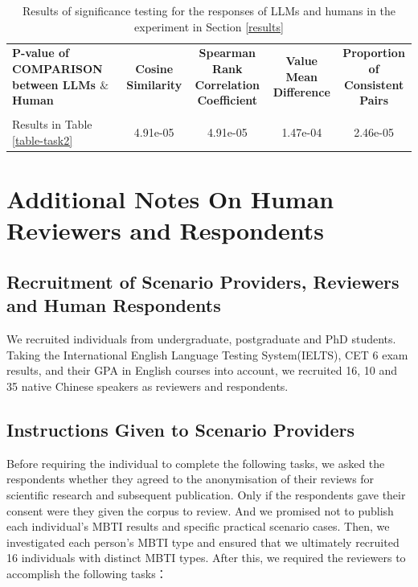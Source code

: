 \documentclass{article}
\theoremstyle{plain}
\theoremstyle{definition}
\theoremstyle{remark}
\begin{document}
\begin{CJK*}{UTF8}{gbsn}
\begin{table}[h]
\caption{\label{table-sf}Results of significance testing for the responses of LLMs and humans in the experiment in Section \ref{results}}
\vskip 0.15in
\centering
\begin{tabular}{lcccc}
\toprule
\multirowcell{2}{\bf P-value of COMPARISON\\\bf between LLMs $\&$ Human} & \multirowcell{2}{\bf Cosine \\\bf Similarity} & \multirowcell{2}{\bf Spearman Rank\\\bf Correlation Coefficient} & \multirowcell{2}{\bf Value Mean\\\bf Difference} & \multirowcell{2}{\bf Proportion of\\\bf Consistent Pairs} \\
             &  &  &  &   \\
\midrule
Results in Table \ref{table-task2}    & 4.91e-05 & 4.91e-05 & 1.47e-04 & 2.46e-05  \\
\bottomrule
\end{tabular}
\vskip -0.1in
\end{table}



\section{Additional Notes On Human Reviewers and Respondents}
\label{sec:human}
\subsection{Recruitment of Scenario Providers, Reviewers and Human Respondents}
We recruited individuals from undergraduate, postgraduate and PhD students. Taking the International English Language Testing System(IELTS), CET 6 exam results, and their GPA in English courses into account, we recruited 16, 10 and 35 native Chinese speakers as reviewers and respondents.

\subsection{Instructions Given to Scenario Providers}
Before requiring the individual to complete the following tasks, we asked the respondents whether they agreed to the anonymisation of their reviews for scientific research and subsequent publication. Only if the respondents gave their consent were they given the corpus to review. And we promised not to publish each individual's MBTI results and specific practical scenario cases. Then, we investigated each person's MBTI type and ensured that we ultimately recruited 16 individuals with distinct MBTI types. After this, we required the reviewers to accomplish the following tasks：


\end{CJK*}
\end{document}
